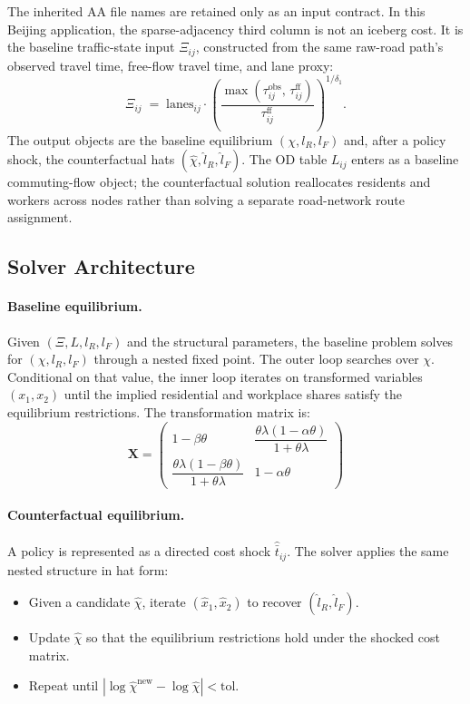 \documentclass[12pt, a4paper]{article}
\begin{document}
The inherited AA file names are retained only as an input contract.  In this
Beijing application, the sparse-adjacency third column is not an iceberg
cost.  It is the baseline traffic-state input $\Xi_{ij}$, constructed from
the same raw-road path's observed travel time, free-flow travel time, and
lane proxy:
\begin{equation}
  \Xi_{ij} \;=\; \text{lanes}_{ij}
    \cdot \left(\frac{\max(\tau_{ij}^{\text{obs}},\,\tau_{ij}^{\text{ff}})}
                     {\tau_{ij}^{\text{ff}}}\right)^{1/\delta_1}.
  \label{eq:bpr_inversion}
\end{equation}
The output objects are the baseline equilibrium $(\chi,l_R,l_F)$ and, after
a policy shock, the counterfactual hats
$(\hat{\chi},\hat{l}_R,\hat{l}_F)$.  The OD table $L_{ij}$ enters as a
baseline commuting-flow object; the counterfactual solution reallocates
residents and workers across nodes rather than solving a separate
road-network route assignment.

\subsection{Solver Architecture}

\paragraph{Baseline equilibrium.}
Given $(\Xi,L,l_R,l_F)$ and the structural parameters, the baseline problem
solves for $(\chi,l_R,l_F)$ through a nested fixed point.  The outer loop
searches over $\chi$.  Conditional on that value, the inner loop iterates on
transformed variables $(x_1,x_2)$ until the implied residential and workplace
shares satisfy the equilibrium restrictions.  The transformation matrix is:
\begin{equation}
  \mathbf{X} =
  \begin{pmatrix}
    1 - \beta\theta & \dfrac{\theta\lambda(1-\alpha\theta)}{1+\theta\lambda} \\[8pt]
    \dfrac{\theta\lambda(1-\beta\theta)}{1+\theta\lambda} & 1 - \alpha\theta
  \end{pmatrix}
\end{equation}

\paragraph{Counterfactual equilibrium.}
A policy is represented as a directed cost shock
$\hat{\bar{t}}_{ij}$.  The solver applies the same nested structure in
hat form:
\begin{itemize}
  \item Given a candidate $\hat{\chi}$, iterate
    $(\hat{x}_1,\hat{x}_2)$ to recover $(\hat{l}_R,\hat{l}_F)$.
  \item Update $\hat{\chi}$ so that the equilibrium restrictions hold under
    the shocked cost matrix.
  \item Repeat until
    $|\log\hat{\chi}^{\text{new}}-\log\hat{\chi}|<\text{tol}$.
\end{itemize}
\end{document}
